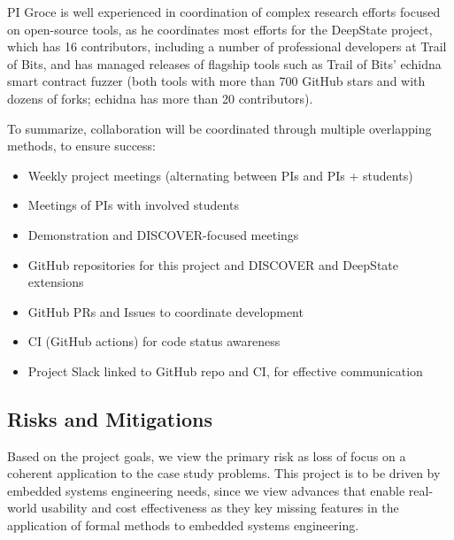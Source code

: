 \documentclass[12pt]{article}
\begin{document}
PI Groce is well experienced in coordination of complex research efforts focused on open-source tools, as he coordinates most efforts for the DeepState project, which has 16 contributors, including a number of professional developers at Trail of Bits, and has managed releases of flagship tools such as Trail of Bits' echidna smart contract fuzzer (both tools with more than 700 GitHub stars and with dozens of forks; echidna has more than 20 contributors).

To summarize, collaboration will be coordinated through multiple overlapping methods, to ensure success:
\begin{itemize}
\item Weekly project meetings (alternating between PIs and PIs + students)
\item Meetings of PIs with involved students
\item Demonstration and DISCOVER-focused meetings
\item GitHub repositories for this project and DISCOVER and DeepState extensions
\item GitHub PRs and Issues to coordinate development
\item CI (GitHub actions) for code status awareness
\item Project Slack linked to GitHub repo and CI, for effective communication
\end{itemize}


\subsection{Risks and Mitigations}

Based on the project goals, we view the primary risk as loss of focus on a coherent application to the case study problems.  This project is to be driven by embedded systems engineering needs, since we view advances that enable real-world usability and cost effectiveness as they key missing features in the application of formal methods to embedded systems engineering.  

\end{document}
